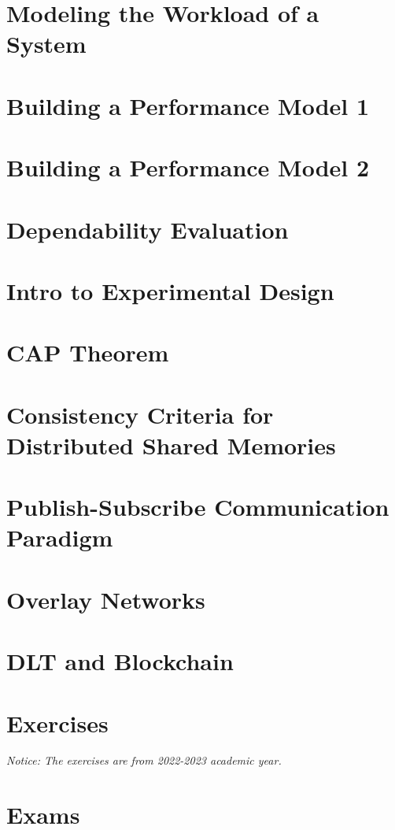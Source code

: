 	\newpage
	\section{Modeling the Workload of a System}
	
	\newpage
	\section{Building a Performance Model 1}
	
	\newpage
	\section{Building a Performance Model 2}
	
	\newpage
	\section{Dependability Evaluation}
	
	\newpage
	\section{Intro to Experimental Design}
	
	\newpage
	\section{CAP Theorem}
	
	\newpage
	\section{Consistency Criteria for Distributed Shared Memories}
	
	\newpage
	\section{Publish-Subscribe Communication Paradigm}
	
	\newpage
	\section{Overlay Networks}
	
	\newpage
	\section{DLT and Blockchain}
		
	\newpage
	\section{Exercises}
	\emph{Notice: The exercises are from 2022-2023 academic year.}
	
	\newpage
	\section{Exams}

	
